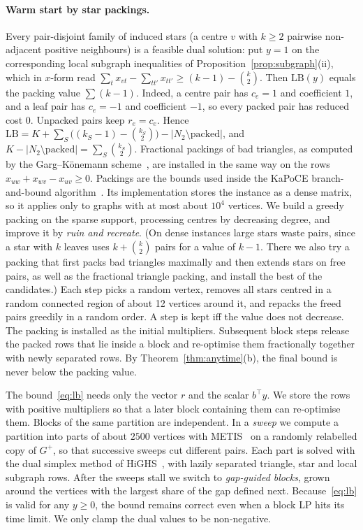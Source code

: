 \documentclass[11pt]{article}
\theoremstyle{definition}
\newcommand{\LB}{\mathrm{LB}}
\newcommand{\Nt}{N_{2}}
\begin{document}
\paragraph{Warm start by star packings.}  Every pair-disjoint family of
induced stars (a centre $v$ with $k\ge2$ pairwise non-adjacent positive
neighbours) is a feasible dual solution: put $y=1$ on the corresponding
local subgraph inequalities of Proposition~\ref{prop:subgraph}(ii), which in
$x$-form read $\sum_t x_{vt}-\sum_{tt'}x_{tt'}\ge (k-1)-\binom k2$.  Then
$\LB(y)$ equals the packing value $\sum(k-1)$.  Indeed, a centre pair has
$c_e=1$ and coefficient $1$, and a leaf pair has $c_e=-1$ and coefficient
$-1$, so every packed pair has reduced cost $0$.  Unpacked pairs keep
$r_e=c_e$.  Hence $\LB=K+\sum_S\big((k_S-1)-\binom{k_S}2\big)-|\Nt\setminus
\text{packed}|$, and $K-|\Nt\setminus\text{packed}|=\sum_S\binom{k_S}{2}$.
Fractional packings of bad triangles, as computed by the Garg--K\"onemann
scheme~\citep{GargK07,Fleischer00}, are installed in the same way on the
rows $x_{uw}+x_{wv}-x_{uv}\ge0$.
Packings are the bounds used inside the KaPoCE branch-and-bound
algorithm~\citep{BlasiusEtAl22sea}.  Its implementation stores the instance
as a dense matrix, so it applies only to graphs with at most about $10^4$
vertices.  We build a greedy packing on the sparse support, processing
centres by decreasing degree, and improve it by \emph{ruin and recreate}.
(On dense instances large stars waste pairs, since a star with $k$ leaves
uses $k+\binom k2$ pairs for a value of $k-1$.  There we also try a packing
that first packs bad triangles maximally and then extends stars on free
pairs, as well as the fractional triangle packing, and install the best of
the candidates.)
Each step picks a random vertex, removes all stars centred in a random
connected region of about 12 vertices around it, and repacks the freed
pairs greedily in a random order.  A step is kept iff the value does not
decrease.  The packing is installed as the initial multipliers.  Subsequent
block steps release the packed rows that lie inside a block and re-optimise
them fractionally together with newly separated rows.  By
Theorem~\ref{thm:anytime}(b), the final bound is never below the packing
value.

The bound~\eqref{eq:lb} needs only the vector $r$ and the scalar $b^\top y$.
We store the rows with positive multipliers so that a later block containing
them can re-optimise them.  Blocks of the same partition are independent.
In a \emph{sweep} we compute a partition into parts of about $2500$ vertices
with METIS~\citep{KarypisK98} on a randomly relabelled copy of $G^+$, so that
successive sweeps cut different pairs.  Each part is solved with the dual
simplex method of HiGHS~\citep{HuangfuH18}, with lazily separated triangle,
star and local subgraph rows.  After the sweeps stall we switch to
\emph{gap-guided blocks}, grown around the vertices with the largest share of
the gap defined next.  Because~\eqref{eq:lb} is valid for any $y\ge0$, the
bound remains correct even when a block LP hits its time limit.  We only
clamp the dual values to be non-negative.
\end{document}
